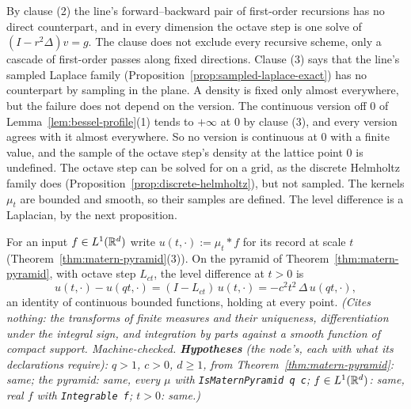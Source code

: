 By clause (2) the line's forward--backward pair of first-order recursions has no direct
counterpart, and in every dimension the octave step is one solve of $(I - r^2\Delta)v = g$. The
clause does not exclude every recursive scheme, only a cascade of first-order passes along fixed
directions. Clause (3) says that the line's sampled Laplace family
(Proposition~\ref{prop:sampled-laplace-exact}) has no counterpart by sampling in the plane. A
density is fixed only almost everywhere, but the failure does not depend on the version. The
continuous version off $0$ of Lemma~\ref{lem:bessel-profile}(1) tends to $+\infty$ at $0$ by clause
(3), and every version agrees with it almost everywhere. So no version is continuous at $0$ with a
finite value, and the sample of the octave step's density at the lattice point $0$ is undefined. The
octave step can be solved for on a grid, as the discrete Helmholtz family does
(Proposition~\ref{prop:discrete-helmholtz}), but not sampled. The kernels $\mu_t$ are bounded and
smooth, so their samples are defined. The level difference is a Laplacian, by the next proposition.

\begin{proposition}
\label{prop:laplacian-pyramid}
\leanok
{}
For an input $f \in L^1(\mathbb{R}^d)$ write $u(t, \cdot) := \mu_t * f$ for its record at scale $t$
(Theorem~\ref{thm:matern-pyramid}(3)).
On the \Matern{} pyramid of Theorem~\ref{thm:matern-pyramid}, with octave step $L_{ct}$, the level
difference at $t > 0$ is
\[
  u(t, \cdot) - u(qt, \cdot) = (I - L_{ct})\,u(t, \cdot) = -c^2t^2\,\Delta\,u(qt, \cdot) ,
\]
an identity of continuous bounded functions, holding at every point.
\statusT\quad\emph{(Cites nothing: the transforms of finite measures and their uniqueness,
differentiation under the integral sign, and integration by parts against a smooth function of
compact support. Machine-checked. \textbf{Hypotheses} (the node's, each with what its declarations
require): $q > 1$, $c > 0$, $d \ge 1$, from Theorem~\ref{thm:matern-pyramid}: same; the \Matern{}
pyramid: same, every $\mu$ with \texttt{IsMaternPyramid q c}; $f \in L^1(\mathbb{R}^d)$: same, real $f$
with \texttt{Integrable f}; $t > 0$: same.)}
\end{proposition}

